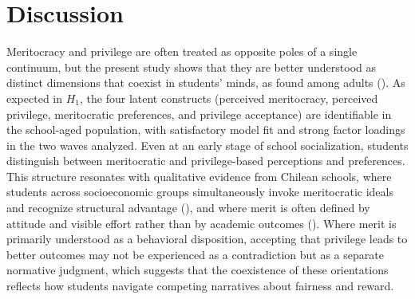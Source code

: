 \documentclass[
  11pt,
]{article}
\begin{document}
\section{Discussion}\label{discussion}

Meritocracy and privilege are often treated as opposite poles of a
single continuum, but the present study shows that they are better
understood as distinct dimensions that coexist in students' minds, as
found among adults
().
As expected in \(H_1\), the four latent constructs (perceived
meritocracy, perceived privilege, meritocratic preferences, and
privilege acceptance) are identifiable in the school-aged population,
with satisfactory model fit and strong factor loadings in the two waves
analyzed. Even at an early stage of school socialization, students
distinguish between meritocratic and privilege-based perceptions and
preferences. This structure resonates with qualitative evidence from
Chilean schools, where students across socioeconomic groups
simultaneously invoke meritocratic ideals and recognize structural
advantage (), and where merit is often defined by attitude and visible
effort rather than by academic outcomes
().
Where merit is primarily understood as a behavioral disposition,
accepting that privilege leads to better outcomes may not be experienced
as a contradiction but as a separate normative judgment, which suggests
that the coexistence of these orientations reflects how students
navigate competing narratives about fairness and reward.
\end{document}
